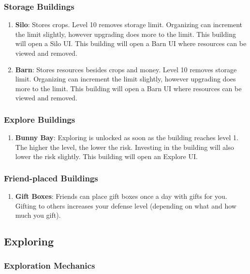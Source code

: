 \documentclass[12pt]{article}
\begin{document}
\subsubsection{Storage Buildings}

\begin{enumerate}
    \item \textbf{Silo}: Stores crops. Level 10 removes storage limit. Organizing can increment the limit slightly, however upgrading does more to the limit. This building will open a Silo UI. This building will open a Barn UI where resources can be viewed and removed.
    \item \textbf{Barn}: Stores resources besides crops and money. Level 10 removes storage limit. Organizing can increment the limit slightly, however upgrading does more to the limit. This building will open a Barn UI where resources can be viewed and removed.
\end{enumerate}

\subsubsection{Explore Buildings}

\begin{enumerate}
    \item \textbf{Bunny Bay}: Exploring is unlocked as soon as the building reaches level 1. The higher the level, the lower the risk. Investing in the building will also lower the risk slightly. This building will open an Explore UI.
\end{enumerate}

\subsubsection{Friend-placed Buildings}

\begin{enumerate}
    \item \textbf{Gift Boxes}: Friends can place gift boxes once a day with gifts for you. Gifting to others increases your defense level (depending on what and how much you gift).
\end{enumerate}

\subsection{Exploring}

\subsubsection{Exploration Mechanics}
\end{document}

